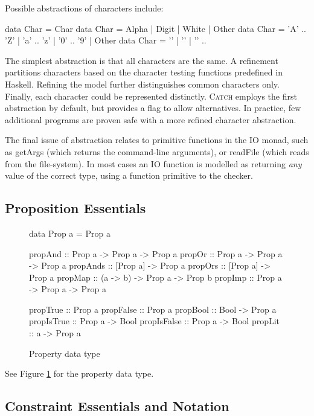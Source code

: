 \documentclass[preprint]{sigplanconf}
\newcommand{\C}[1]{\textsf{#1}}
\newcommand{\catch}{\textsc{Catch}}
\newcommand{\ignore}{}
\begin{document}
Possible abstractions of characters include:

\ignore\begin{code}
data Char = Char
data Char = Alpha | Digit | White | Other
data Char = 'A' .. 'Z' | 'a' .. 'z' | '0' .. '9' | Other
data Char = '\0' | '\1' | '\2' ..
\end{code}

\noindent The simplest abstraction is that all characters are the same. A refinement partitions characters based on the character testing functions predefined in Haskell. Refining the model further distinguishes common characters only. Finally, each character could be represented distinctly. \catch{} employs the first abstraction by default, but provides a flag to allow alternatives. In practice, few additional programs are proven safe with a more refined character abstraction.

The final issue of abstraction relates to primitive functions in the \C{IO} monad, such as \C{getArgs} (which returns the command-line arguments), or \C{readFile} (which reads from the file-system). In most cases an IO function is modelled as returning \textit{any} value of the correct type, using a function primitive to the checker.

\subsection{Proposition Essentials}

\begin{figure}
\begin{code}
data Prop a =  Prop a

propAnd :: Prop a -> Prop a -> Prop a
propOr  :: Prop a -> Prop a -> Prop a
propAnds :: [Prop a] -> Prop a
propOrs :: [Prop a] -> Prop a
propMap :: (a -> b) -> Prop a -> Prop b
propImp :: Prop a -> Prop a -> Prop a

propTrue :: Prop a
propFalse :: Prop a
propBool :: Bool -> Prop a
propIsTrue :: Prop a -> Bool
propIsFalse :: Prop a -> Bool
propLit :: a -> Prop a
\end{code}
\caption{Property data type}
\label{fig:prop}
\end{figure}

See Figure \ref{fig:prop} for the property data type.

\subsection{Constraint Essentials and Notation}
\label{sec:constraints}
\end{document}
